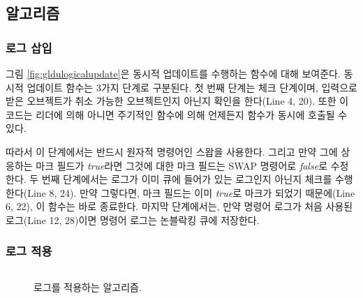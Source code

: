 \subsection{알고리즘}

\subsubsection{로그 삽입}
그림 \ref{fig:gldulogicalupdate}은 동시적 업데이트를 수행하는 함수에 대해 보여준다.
동시적 업데이트 함수는 3가지 단계로 구분된다.
첫 번째 단계는 체크 단계이며, 입력으로 받은 오브젝트가 취소 가능한 오브젝트인지 아닌지 확인을 한다(Line 4, 20). 
또한 이 코드는 리더에 의해 아니면 주기적인 함수에 의해 언제든지  함수가 동시에 호출될 수 있다. 

따라서 이 단계에서는 반드시 원자적 명령어인 스왑을 사용한다.
그리고 만약 그에 상응하는 마크 필드가 \textit{true}라면 그것에 대한 마크 필드는 SWAP 명령어로 \textit{false}로
수정한다.
두 번째 단계에서는 로그가 이미 큐에 들어가 있는 로그인지 아닌지 체크를 수행한다(Line 8, 24).
만약 그렇다면, 마크 필드는 이미 \textit{true}로 마크가 되었기 때문에(Line 6, 22), 이 함수는 바로 종료한다.
마지막 단계에서는, 만약 명령어 로그가 처음 사용된 로그(Line 12, 28)이면 명령어 로그는 논블락킹 큐에 저장한다.

\subsubsection{로그 적용}

\begin{figure}[h]
\begin{center}
\inputminted[linenos,fontsize=\footnotesize, tabsize=4]{c}{src/ldu_physical.c}
\end{center}
\caption{로그를 적용하는 알고리즘.}
\label{fig:glduphysicalupdate}
\end{figure}


